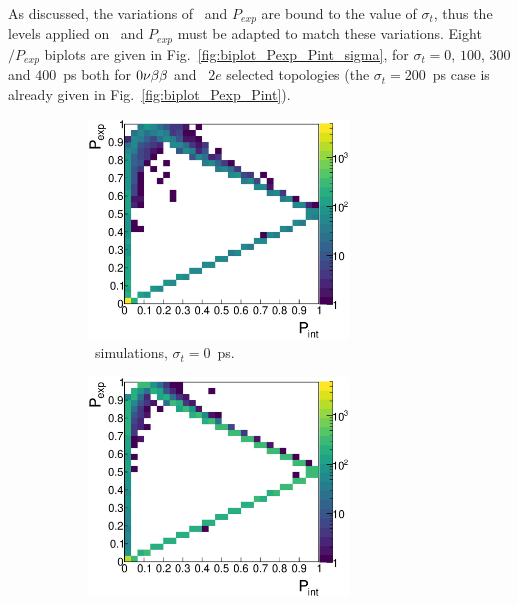 As discussed, the variations of \Pint\ and $P_{exp}$ are bound to the value of $\sigma_{t}$, thus the levels applied on \Pint\ and $P_{exp}$ must be adapted to match these variations.
Eight \Pint$/P_{exp}$ biplots are given in Fig.~\ref{fig:biplot_Pexp_Pint_sigma}, for $\sigma_{t}=0$, $100$, $300$ and $400$~ps both for $0\nu\beta\beta$ and \Tl\ $2e$ selected topologies (the ${\sigma_{t}=200}$~ps case is already given in Fig.~\ref{fig:biplot_Pexp_Pint}).
\begin{figure}[!h]
\centering
\begin{subfigure}[t]{0.49\textwidth}
  \centering
  \includegraphics[width=0.76\textwidth]{timedifference/fig_timediff/PintVSPexp_208Tl_0.eps}
  \captionsetup{justification=justified}
  \caption{\Tl\ simulations, ${\sigma_{t}=0}$~ps.
    \label{subfig:}}
\end{subfigure}
\hfill
\begin{subfigure}[t]{0.49\textwidth}
  \centering
  \includegraphics[width=0.76\textwidth]{timedifference/fig_timediff/PintVSPexp_0nubb_0.eps}

\end{subfigure}
\end{figure}
